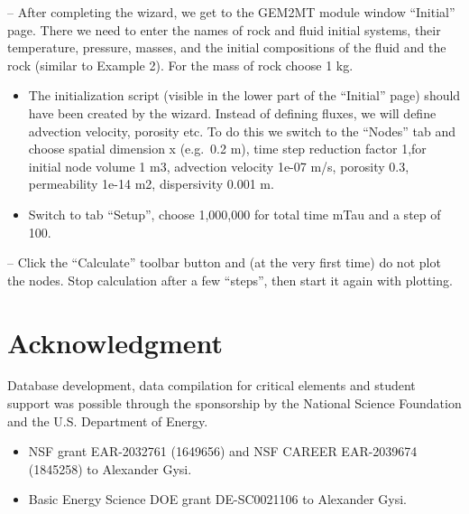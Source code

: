 \documentclass[
]{book}
\providecommand{\tightlist}{%
  \setlength{\itemsep}{0pt}\setlength{\parskip}{0pt}}
\begin{document}
-- After completing the wizard, we get to the GEM2MT module window ``Initial'' page. There we need to enter the names of rock and fluid initial systems, their temperature, pressure, masses, and the initial compositions of the fluid and the rock (similar to Example 2). For the mass of rock choose 1 kg.

\begin{itemize}
\item
  The initialization script (visible in the lower part of the ``Initial'' page) should have been created by the wizard. Instead of defining fluxes, we will define advection velocity, porosity etc. To do this we switch to the ``Nodes'' tab and choose spatial dimension x (e.g.~0.2 m), time step reduction factor 1,for initial node volume 1 m3, advection velocity 1e-07 m/s, porosity 0.3, permeability 1e-14 m2, dispersivity 0.001 m.
\item
  Switch to tab ``Setup'', choose 1,000,000 for total time mTau and a step of 100.
\end{itemize}

-- Click the ``Calculate'' toolbar button and (at the very first time) do not plot the nodes. Stop calculation after a few ``steps'', then start it again with plotting.

\hypertarget{acknowledgment}{%
\chapter*{Acknowledgment}\label{acknowledgment}}

Database development, data compilation for critical elements and student support was possible through the sponsorship by the National Science Foundation and the U.S. Department of Energy.

\begin{itemize}
\tightlist
\item
  NSF grant EAR-2032761 (1649656) and NSF CAREER EAR-2039674 (1845258) to Alexander Gysi.
\item
  Basic Energy Science DOE grant DE-SC0021106 to Alexander Gysi.
\end{itemize}

  
\end{document}
